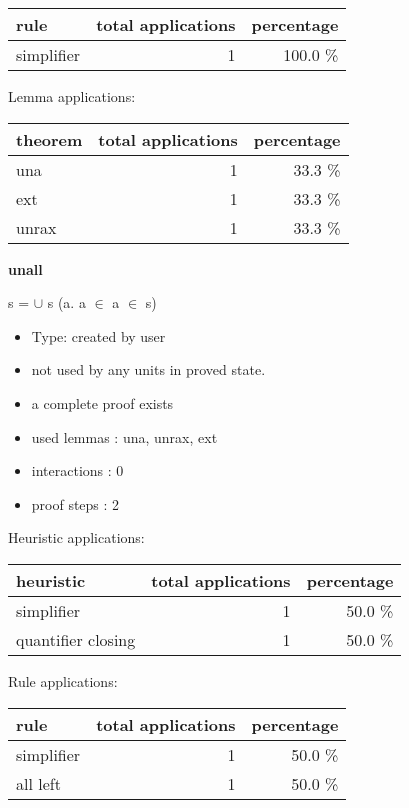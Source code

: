 \documentclass[a4paper]{article}
\begin{document}
\begin{supertabular}{l|r|r}
rule	        & total applications & percentage \\ \hline
simplifier & 1 & 100.0 \% \\

\end{supertabular}

Lemma applications:

\begin{supertabular}{l|r|r}
theorem	        & total applications & percentage \\ \hline
una & 1 & 33.3 \% \\
ext & 1 & 33.3 \% \\
unrax & 1 & 33.3 \% \\

\end{supertabular}
\pagebreak

{\LARGE\bf unall}\label{lemma-unall}

\medskip

 \Fol s =  $\cup$ s \Equiv (\All a. a $\in$  \Imp a $\in$ s)

\begin{itemize}

\item Type: created by user

\item not used by any units in proved state.
\item       a complete proof exists
\item       used lemmas  : una, unrax, ext
\item       interactions : 0
\item       proof steps  : 2
\end{itemize}

\medskip


Heuristic applications:

\begin{supertabular}{l|r|r}
heuristic	& total applications & percentage \\ \hline
simplifier & 1 & 50.0 \% \\
quantifier closing & 1 & 50.0 \% \\

\end{supertabular}

Rule applications:

\begin{supertabular}{l|r|r}
rule	        & total applications & percentage \\ \hline
simplifier & 1 & 50.0 \% \\
all left & 1 & 50.0 \% \\

\end{supertabular}
\end{document}
